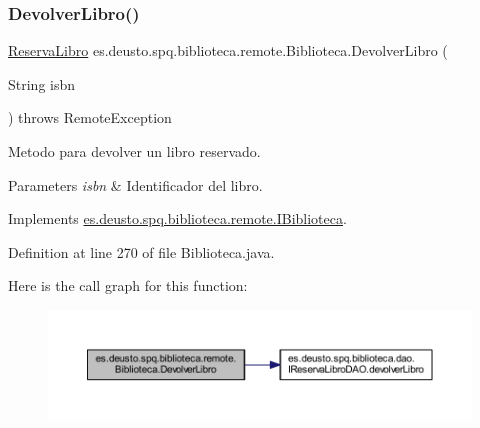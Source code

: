 \subsubsection{\texorpdfstring{Devolver\+Libro()}{DevolverLibro()}}
{\footnotesize\ttfamily \mbox{\hyperlink{classes_1_1deusto_1_1spq_1_1biblioteca_1_1data_1_1_reserva_libro}{Reserva\+Libro}} es.\+deusto.\+spq.\+biblioteca.\+remote.\+Biblioteca.\+Devolver\+Libro (\begin{DoxyParamCaption}\item[{String}]{isbn }\end{DoxyParamCaption}) throws Remote\+Exception}

Metodo para devolver un libro reservado. 
\begin{DoxyParams}{Parameters}
{\em isbn} & Identificador del libro. \\
\hline
\end{DoxyParams}


Implements \mbox{\hyperlink{interfacees_1_1deusto_1_1spq_1_1biblioteca_1_1remote_1_1_i_biblioteca_aace05bd0eeb7af574d9725203672f5c8}{es.\+deusto.\+spq.\+biblioteca.\+remote.\+I\+Biblioteca}}.



Definition at line 270 of file Biblioteca.\+java.

Here is the call graph for this function\+:
\nopagebreak
\begin{figure}[H]
\begin{center}
\leavevmode
\includegraphics[width=350pt]{classes_1_1deusto_1_1spq_1_1biblioteca_1_1remote_1_1_biblioteca_a739d23f2912d2f102eadf6e90c12ab61_cgraph}
\end{center}
\end{figure}
\mbox{\label{classes_1_1deusto_1_1spq_1_1biblioteca_1_1remote_1_1_biblioteca_ac1f6d54dda74f91519d3d6cbc86b35d6}} 
